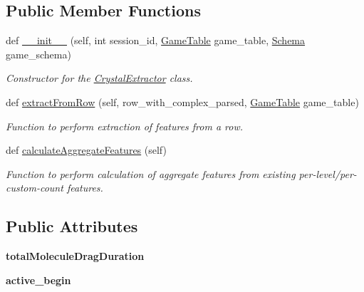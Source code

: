 \subsection*{Public Member Functions}
\begin{DoxyCompactItemize}
\item 
def \mbox{\hyperlink{classfeature__extractors_1_1_crystal_extractor_1_1_crystal_extractor_aea1e68ff155db25ec9ec391e5f65fa92}{\+\_\+\+\_\+init\+\_\+\+\_\+}} (self, int session\+\_\+id, \mbox{\hyperlink{class_game_table_1_1_game_table}{Game\+Table}} game\+\_\+table, \mbox{\hyperlink{classschemas_1_1_schema_1_1_schema}{Schema}} game\+\_\+schema)
\begin{DoxyCompactList}\small\item\em Constructor for the \mbox{\hyperlink{classfeature__extractors_1_1_crystal_extractor_1_1_crystal_extractor}{Crystal\+Extractor}} class. \end{DoxyCompactList}\item 
def \mbox{\hyperlink{classfeature__extractors_1_1_crystal_extractor_1_1_crystal_extractor_a916b4ecdb7842673f8f62d61732d5624}{extract\+From\+Row}} (self, row\+\_\+with\+\_\+complex\+\_\+parsed, \mbox{\hyperlink{class_game_table_1_1_game_table}{Game\+Table}} game\+\_\+table)
\begin{DoxyCompactList}\small\item\em Function to perform extraction of features from a row. \end{DoxyCompactList}\item 
def \mbox{\hyperlink{classfeature__extractors_1_1_crystal_extractor_1_1_crystal_extractor_ac0aa2a8037f8e7575788a8ac88836538}{calculate\+Aggregate\+Features}} (self)
\begin{DoxyCompactList}\small\item\em Function to perform calculation of aggregate features from existing per-\/level/per-\/custom-\/count features. \end{DoxyCompactList}\end{DoxyCompactItemize}
\subsection*{Public Attributes}
\begin{DoxyCompactItemize}
\item 
\mbox{\label{classfeature__extractors_1_1_crystal_extractor_1_1_crystal_extractor_a1ef83a8220aed0858a87829de0002f77}} 
{\bfseries total\+Molecule\+Drag\+Duration}
\item 
\mbox{\label{classfeature__extractors_1_1_crystal_extractor_1_1_crystal_extractor_aa47c2d1bc42bff117848aae0d7a391a4}} 
{\bfseries active\+\_\+begin}
\end{DoxyCompactItemize}
